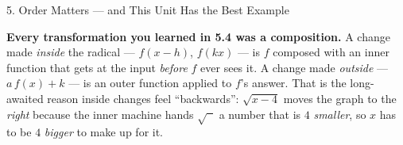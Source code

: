 \documentclass[10pt]{article}
\begin{document}
\begin{notesbox}{5. Order Matters --- and This Unit Has the Best Example}
\begin{center}
\begin{tcolorbox}[colback=forestbg, colframe=forest, boxrule=0.7pt, arc=1.5mm, width=0.94\linewidth,
    left=3mm, right=3mm, top=1.5mm, bottom=1.5mm]
\small \textbf{Every transformation you learned in 5.4 was a composition.} A change made
\emph{inside} the radical --- $f(x-h)$, $f(kx)$ --- is $f$ composed with an inner function that gets
at the input \emph{before} $f$ ever sees it. A change made \emph{outside} --- $a\,f(x)+k$ --- is an
outer function applied to $f$'s answer. That is the long-awaited reason inside changes feel
``backwards'': $\sqrt{x-4}$ moves the graph to the \emph{right} because the inner machine hands
$\sqrt{\phantom{x}}$ a number that is $4$ \emph{smaller}, so $x$ has to be $4$ \emph{bigger} to make
up for it.
\end{tcolorbox}
\end{center}
\end{notesbox}
\end{document}
